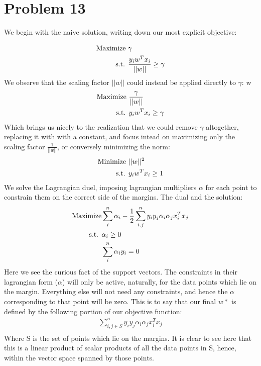 \documentclass[a4paper,12pt]{article}
\begin{document}
\section*{Problem 13}
We begin with the naive solution, writing down our most explicit objective:

\begin{align*}
\text{Maximize }  &\null \gamma  \\
\text{s.t. } &\null  \frac{y_iw^Tx_i}{||w||} \geq \gamma
\end{align*}
%
We observe that the scaling factor $||w||$ could instead be applied directly to $\gamma$:
w\begin{align*}
\text{Maximize }  &\null \frac{\gamma}{||w||}  \\
\text{s.t. } &\null  y_iw^Tx_i \geq \gamma
\end{align*}
%
Which brings us nicely to the realization that we could remove $\gamma$ altogether, replacing it with with a constant, and focus intead on maximizing only the scaling factor $\frac{1}{||w||}$, or conversely minimizing the norm:
\begin{align*}
\text{Minimize }  &\null ||w||^2  \\
\text{s.t. } &\null  y_iw^Tx_i \geq 1
\end{align*}
%
We solve the Lagrangian duel, imposing lagrangian multipliers $\alpha$ for each point to constrain them on the correct side of the margins. The dual and the solution:
\begin{align*}
\text{Maximize}  &\null \sum_i^n \alpha_i - \frac{1}{2}\sum_{i,j}^n y_iy_j\alpha_i \alpha_j x_i^Tx_j\\
\text{s.t. } &\null  \alpha_i \geq 0 \\
  &\null \sum_{i}^n\alpha_iy_i = 0
\end{align*}
Here we see the curious fact of the support vectors. The constraints in their lagrangian form ($\alpha$) will only be active, naturally, for the data points which lie on the margin. Everything else will not need any constraints, and hence the $\alpha$ corresponding to that point will be zero. This is to say that our final $w*$ is defined by the following portion of our objective function:
\begin{align*}
\sum_{i,j \in S}^n y_iy_j\alpha_i \alpha_j x_i^Tx_j\\
\end{align*}
%
Where S is the set of points which lie on the margins. It is clear to see here that this is a linear product of scalar products of all the data points in S, hence, within the vector space spanned by those points.
\end{document}
